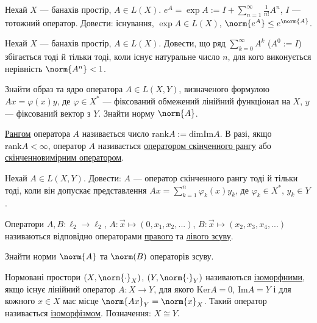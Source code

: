 \begin{exercise}
    Нехай $X$ --- банахів простір, $A \in L(X)$. $e^A = \exp{A} := I + \sum\limits_{n=1}^{\infty} \frac{1}{n!}A^n$, $I$ --- тотожний оператор.
    Довести: існування, $\exp{A} \in L(X)$, $\norm{e^A} \leq e^{\norm{A}}$.
\end{exercise}

\begin{exercise}
    Нехай $X$ --- банахів простір, $A\in L(X)$. Довести, що ряд $\sum_{k=0}^{\infty} A^k$ ($A^0 := I$)
    збігається тоді й тільки тоді, коли існує натуральне число $n$, для кого виконується нерівність $\norm{A^n} < 1$.
\end{exercise}

\begin{exercise}
    Знайти образ та ядро оператора $A \in L\left( X, Y\right)$, визначеного формулою $Ax = \varphi(x) y$,
    де $\varphi \in X^*$ --- фіксований обмежений лінійний функціонал на $X$, $y$ --- фіксований вектор з $Y$.
    Знайти норму $\norm{A}$.
\end{exercise}

\begin{theory}
    \underline{Рангом} оператора $A$ називається число $\mathrm{rank}A := \mathrm{dim} \mathrm{Im}A$.
    В разі, якщо $\mathrm{rank} A < \infty$, оператор $A$ називається
    \underline{оператором скінченного рангу} або \underline{скінченновимірним оператором}.
\end{theory}

\begin{exercise}
    Нехай $A \in L\left( X, Y\right)$. Довести: $A$ --- оператор скінченного рангу тоді й тільки тоді, коли він допускає представлення
    $Ax = \sum\limits_{k=1}^n \varphi_k(x) y_k$, де $\varphi_k \in X^*$, $y_k \in Y$.
\end{exercise}

\begin{theory}
    Оператори $A, B: \ell_2 \rightarrow \ell_2$, $A : \vec{x} \mapsto (0, x_1, x_2, ...)$, $B : \vec{x} \mapsto (x_2, x_3, x_4, ...)$
    називаються відповідно операторами \underline{правого} та \underline{лівого зсуву}.
\end{theory}

\begin{exercise}
    Знайти норми $\norm{A}$ та $\norm(B)$ операторів зсуву.
\end{exercise}

\begin{theory}
    Нормовані простори $(X, \norm{\cdot}_X)$, $(Y, \norm{\cdot}_Y)$ називаються 
    \underline{ізоморфними}, якщо існує лінійний оператор $A: X \rightarrow Y$, для якого $\mathrm{Ker}A = {0}$,
    $\mathrm{Im}A = Y$ і для кожного $x \in X$ має місце $\norm{Ax}_Y = \norm{x}_X$. Такий оператор
    називається \underline{ізоморфізмом}. Позначення: $X \cong Y$.
\end{theory}

